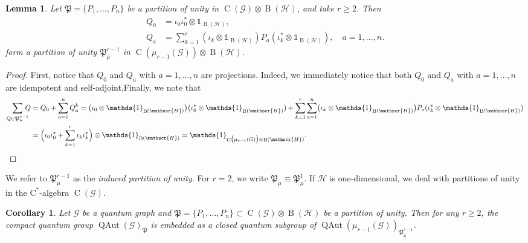 \documentclass[11pt,reqno]{amsart}
\newtheorem{lemma}[proposition]{Lemma}
\newtheorem{corollary}[proposition]{Corollary}
\newcommand{\cst}{\ensuremath{\mathrm{C}^*}}
\newcommand{\I}{\mathds{1}}
\newcommand{\tens}{\otimes}
\DeclareMathOperator{\QAut}{QAut}
\DeclareMathOperator{\B}{B}
\DeclareMathOperator{\C}{C}
\begin{document}
\begin{lemma}\label{partunit}
Let $\mathfrak{P}=\{P_1,\ldots, P_n\}$ be a partition of unity in $\C(\mathcal{G})\tens\B(\mathscr{H})$, and take $r\geq 2$. Then
\[
\begin{aligned}
    Q_0&=\iota_0\iota^*_0\tens\I_{\B(\mathscr{H})},\\
    Q_a&=\sum\limits_{k=1}^r(\iota_k\tens\I_{\B(\mathscr{H})})P_a(\iota_k^*\tens\I_{\B(\mathscr{H})}),\quad a=1,\dotsc,n.
\end{aligned}
\]
form a partition of unity $\mathfrak{P}_{\mu}^{r-1}$ in $\C(\mu_{r-1}(\mathcal{G}))\tens\B(\mathscr{H})$.
\end{lemma}
\begin{proof}
First, notice that $Q_0$ and $Q_a$ with $a=1,\ldots,n$ are projections. Indeed, we immediately notice that both $Q_0$ and $Q_a$ with $a=1,\ldots,n$ are idempotent and self-adjoint.Finally, we note that
\[
\begin{aligned}
\sum\limits_{Q\in\mathfrak{P}_\mu^{r-1}}\!\!\!\!Q&=Q_0+\sum\limits_{a=1}^n Q_a^k =\bigl(\iota_0\tens\I_{\B(\mathscr{H})}\bigr)\bigl(\iota_0^\ast\tens\I_{\B(\mathscr{H})}) +\sum\limits_{k=1}^r\sum\limits_{a=1}^n\bigl(\iota_k\tens\I_{\B(\mathscr{H})}\bigr) P_a(\iota_k^\ast\tens\I_{\B(\mathscr{H})})\\
&=\Bigl(\iota_0\iota_0^\ast +\sum\limits_{k=1}^r\iota_k\iota_k^\ast\Bigr)\tens\I_{\B(\mathscr{H})}=\I_{\C\bigl(\mu_{r-1}(G)\bigr)\tens\B(\mathscr{H})}.
\end{aligned}
   \]
\end{proof}
We refer to $\mathfrak{P}_{\mu}^{r-1}$ as the {\it induced partition of unity}. For $r=2$, we write $\mathfrak{P}_{\mu}\equiv\mathfrak{P}_{\mu}^1$. If $\mathscr{H}$ is one-dimensional, we deal with partitions of unity in the $\cst$-algebra $\C(\mathcal{G})$.
\begin{corollary}
\label{cor:subgroup}
Let $\mathcal{G}$ be a quantum graph and $\mathfrak{P} =\{P_1,\ldots,P_n\}\subset\C(\mathcal{G})\tens\B(\mathscr{H})$ be a partition of unity. Then for any $r\geq{2}$, the compact quantum group $\QAut(\mathcal{G})_{\mathfrak{P}}$ is embedded as a closed quantum subgroup of $\QAut(\mu_{r-1}(\mathcal{G}))_{\mathfrak{P}_{\mu}^{r-1}}$.
\end{corollary}
\end{document}
